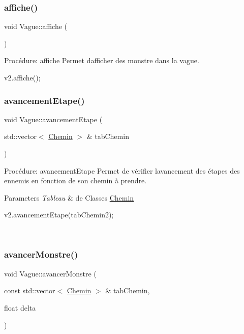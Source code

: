 \subsubsection{\texorpdfstring{affiche()}{affiche()}}
{\footnotesize\ttfamily void Vague\+::affiche (\begin{DoxyParamCaption}{ }\end{DoxyParamCaption})}



Procédure\+: affiche Permet d\textquotesingle{}afficher des monstre dans la vague. 


\begin{DoxyCode}
v2.affiche();
\end{DoxyCode}
 \mbox{\label{classVague_ab61cff7242c22ec90c6cb4858b5a0bc6}} 
\subsubsection{\texorpdfstring{avancement\+Etape()}{avancementEtape()}}
{\footnotesize\ttfamily void Vague\+::avancement\+Etape (\begin{DoxyParamCaption}\item[{std\+::vector$<$ \hyperlink{classChemin}{Chemin} $>$ \&}]{tab\+Chemin }\end{DoxyParamCaption})}



Procédure\+: avancement\+Etape Permet de vérifier l\textquotesingle{}avancement des étapes des ennemis en fonction de son chemin à prendre. 


\begin{DoxyParams}{Parameters}
{\em Tableau} & de Classes \hyperlink{classChemin}{Chemin} 
\begin{DoxyCode}
v2.avancementEtape(tabChemin2);
\end{DoxyCode}
 \\
\hline
\end{DoxyParams}
\mbox{\label{classVague_a2a81df1228dfa2ad84109612ef378d4c}} 
\subsubsection{\texorpdfstring{avancer\+Monstre()}{avancerMonstre()}}
{\footnotesize\ttfamily void Vague\+::avancer\+Monstre (\begin{DoxyParamCaption}\item[{const std\+::vector$<$ \hyperlink{classChemin}{Chemin} $>$ \&}]{tab\+Chemin,  }\item[{float}]{delta }\end{DoxyParamCaption})}



